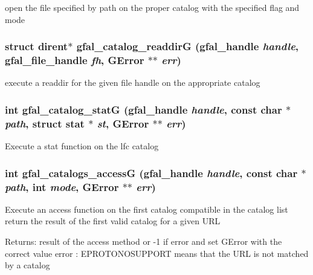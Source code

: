 open the file specified by path on the proper catalog with the specified flag and mode 
\subsubsection{\setlength{\rightskip}{0pt plus 5cm}struct dirent$\ast$ gfal\_\-catalog\_\-readdir\-G (gfal\_\-handle {\em handle}, gfal\_\-file\_\-handle {\em fh}, GError $\ast$$\ast$ {\em err})}\label{gfal__common__catalog_8h_9ba0d48d73fe53d42d3a715e57473adb}


execute a readdir for the given file handle on the appropriate catalog 
\subsubsection{\setlength{\rightskip}{0pt plus 5cm}int gfal\_\-catalog\_\-stat\-G (gfal\_\-handle {\em handle}, const char $\ast$ {\em path}, struct stat $\ast$ {\em st}, GError $\ast$$\ast$ {\em err})}\label{gfal__common__catalog_8h_28ca68c00e4a67bc158975ef3e4f8013}


Execute a stat function on the lfc catalog 
\subsubsection{\setlength{\rightskip}{0pt plus 5cm}int gfal\_\-catalogs\_\-access\-G (gfal\_\-handle {\em handle}, const char $\ast$ {\em path}, int {\em mode}, GError $\ast$$\ast$ {\em err})}\label{gfal__common__catalog_8h_4fd85b35f2134b73207c12b54e85959d}


Execute an access function on the first catalog compatible in the catalog list return the result of the first valid catalog for a given URL \begin{Desc}
\item[Returns:]result of the access method or -1 if error and set GError with the correct value error : EPROTONOSUPPORT means that the URL is not matched by a catalog \end{Desc}
